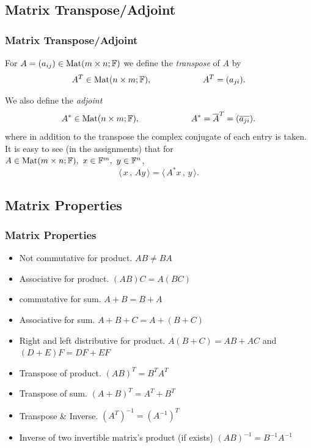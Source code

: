 \documentclass[12pt, t]{beamer}
\renewcommand{\emph}[1]{{\color{Turquoise3}\textsl{#1}}}
\newcommand{\scp}[2]{\langle\,#1\,,\,#2\,\rangle} \newcommand{\scpp}{\langle\,\cdot\,,\,\cdot\,\rangle}
\begin{document}
\subsection{Matrix Transpose/Adjoint}
\begin{frame}
    \frametitle{Matrix Transpose/Adjoint}
    For $A=(a_{ij})\in\text{Mat}(m\times n;\mathbb{F})$ we define the \emph{transpose} of $A$ by
    \[A^T\in\text{Mat}(n\times m;\mathbb{F}),\qquad\qquad\qquad A^T=(a_{ji}).\]

    We also define the \emph{adjoint}
    \[A^*\in\text{Mat}(n\times m;\mathbb{F}),\qquad\qquad\qquad A^*=\overline{A}^T=(\overline{a_{ji}}).\]
    where in addition to the transpose the complex conjugate of each entry is
    taken.\\[9pt]
    It is easy to see (in the assignments) that for $A\in\text{Mat}(m\times n;\mathbb{F}),~x\in\mathbb{F}^m,~y\in\mathbb{F}^n$,
    \[\scp{x}{Ay}=\scp{A^*x}{y}.\]
\end{frame}

\subsection{Matrix Properties}
\begin{frame}
    \frametitle{Matrix Properties}
    \begin{itemize}
        \item Not commutative for product. $AB\neq BA$
        \item Associative for product. $(AB)C=A(BC)$
        \item commutative for sum. $A+B=B+A$
        \item Associative for sum. $A+B+C=A+(B+C)$
        \item Right and left distributive for product. $A(B+C)=AB+AC$ and $(D+E)F=DF+EF$
        \item Transpose of product. $(AB)^T=B^TA^T$
        \item Transpose of sum. $(A+B)^T=A^T+B^T$
        \item Transpose \& Inverse. $(A^T)^{-1}=(A^{-1})^T$
        \item Inverse of two invertible matrix's product (if exists) $(AB)^{-1}=B^{-1}A^{-1}$
    \end{itemize}
\end{frame}
\end{document}
